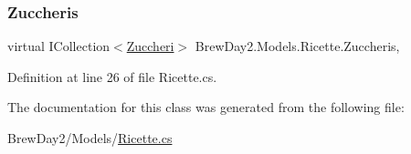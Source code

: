 \subsubsection{\texorpdfstring{Zuccheris}{Zuccheris}}
{\footnotesize\ttfamily virtual I\+Collection$<$\mbox{\hyperlink{class_brew_day2_1_1_models_1_1_zuccheri}{Zuccheri}}$>$ Brew\+Day2.\+Models.\+Ricette.\+Zuccheris\hspace{0.3cm}{\ttfamily [get]}, {\ttfamily [set]}}



Definition at line 26 of file Ricette.\+cs.



The documentation for this class was generated from the following file\+:\begin{DoxyCompactItemize}
\item 
Brew\+Day2/\+Models/\mbox{\hyperlink{_ricette_8cs}{Ricette.\+cs}}\end{DoxyCompactItemize}
